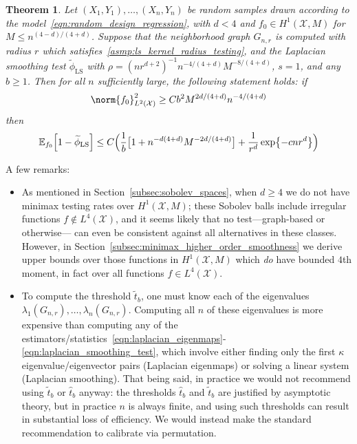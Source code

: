 \documentclass{article}
\newcommand{\1}{\mathbf{1}}
\newcommand{\Xset}{\mathcal{X}}
\newcommand{\Leb}{L}
\newcommand{\Ebb}{\mathbb{E}}
\newcommand{\wt}[1]{\widetilde{#1}}
\newcommand{\wh}[1]{\widehat{#1}}
\newcommand{\LS}{\mathrm{LS}}
\theoremstyle{alden}
\theoremstyle{aldenthm}
\newtheorem{theorem}{Theorem}
\theoremstyle{definition}
\theoremstyle{remark}
\begin{document}
\begin{theorem}
	\label{thm:laplacian_smoothing_testing1}
	Let $(X_1,Y_1),\ldots,(X_n,Y_n)$ be random samples drawn according to the model~\eqref{eqn:random_design_regression}, with $d < 4$ and $f_0 \in H^1(\Xset,M)$ for $M \leq n^{(4 - d)/(4 + d)}$. Suppose that the neighborhood graph $G_{n,r}$ is computed with radius $r$ which satisfies~\ref{asmp:ls_kernel_radius_testing}, and the Laplacian smoothing test $\wt{\phi}_{\LS}$ with $\rho = (nr^{d + 2})^{-1} n^{-4/(4 + d)} M^{-8/(4 + d)}$, $s = 1$, and any $b \geq 1$. Then for all $n$ sufficiently large, the following statement holds: if
	\begin{equation}
	\label{eqn:laplacian_smoothing_testing1}
	\norm{f_0}_{\Leb^2(\Xset)}^2 \geq C b^2 M^{2d/(4 + d)} n^{-4/(4 + d)}
	\end{equation} 
	then
	\begin{equation*}
	\Ebb_{f_0}\Bigl[1 - \wt{\phi}_{\LS} \Bigr] \leq C\Bigl(\frac{1}{b}\bigl[1 + n^{-d(4 + d)}M^{-2d/(4 + d)}\bigr] + \frac{1}{r^d}\exp\bigl\{-cnr^d\bigr\}\Bigr)
	\end{equation*}
\end{theorem}

A few remarks:
\begin{itemize}
	\item As mentioned in Section~\ref{subsec:sobolev_spaces}, when $d \geq 4$ we do not have minimax testing rates over $H^1(\Xset,M)$; these Sobolev balls include irregular functions $f \not\in \Leb^4(\Xset)$, and it seems likely that no test---graph-based or otherwise--- can even be consistent against all alternatives in these classes. However, in Section~\ref{subsec:minimax_higher_order_smoothness} we derive upper bounds over those functions in $H^1(\Xset,M)$ which \emph{do} have bounded $4$th moment, in fact over all functions $f \in \Leb^4(\Xset)$.
	\item To compute the threshold $\wt{t}_b$, one must know each of the eigenvalues $\lambda_1(G_{n,r}),\ldots,\lambda_n(G_{n,r})$. Computing all $n$ of these eigenvalues is more expensive than computing any of the estimators/statistics~\eqref{eqn:laplacian_eigenmaps}-\eqref{eqn:laplacian_smoothing_test}, which involve either finding only the first $\kappa$ eigenvalue/eigenvector pairs (Laplacian eigenmaps) or solving a linear system (Laplacian smoothing). That being said, in practice we would not recommend using $\wt{t}_b$ or $\wh{t}_b$ anyway: the thresholds $\wh{t}_b$ and $\wt{t}_b$ are justified by asymptotic theory, but in practice $n$ is always finite, and using such thresholds can result in substantial loss of efficiency. We would instead make the standard recommendation to calibrate via permutation. 
\end{itemize}
\end{document}
